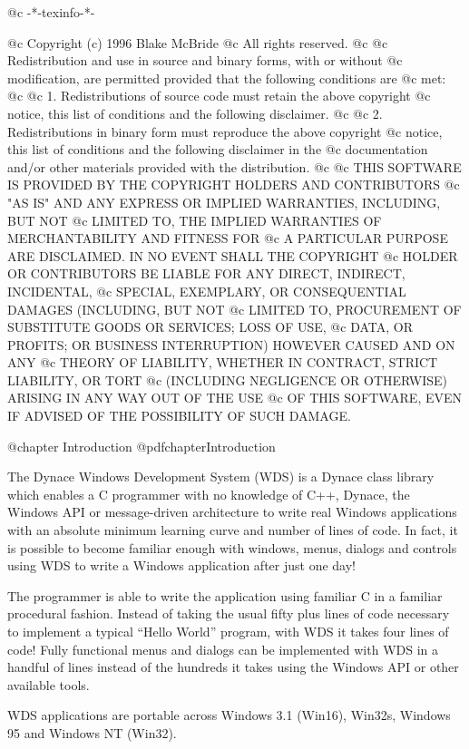 @c -*-texinfo-*-

@c  Copyright (c) 1996 Blake McBride
@c  All rights reserved.
@c
@c  Redistribution and use in source and binary forms, with or without
@c  modification, are permitted provided that the following conditions are
@c  met:
@c
@c  1. Redistributions of source code must retain the above copyright
@c  notice, this list of conditions and the following disclaimer.
@c
@c  2. Redistributions in binary form must reproduce the above copyright
@c  notice, this list of conditions and the following disclaimer in the
@c  documentation and/or other materials provided with the distribution.
@c
@c  THIS SOFTWARE IS PROVIDED BY THE COPYRIGHT HOLDERS AND CONTRIBUTORS
@c  "AS IS" AND ANY EXPRESS OR IMPLIED WARRANTIES, INCLUDING, BUT NOT
@c  LIMITED TO, THE IMPLIED WARRANTIES OF MERCHANTABILITY AND FITNESS FOR
@c  A PARTICULAR PURPOSE ARE DISCLAIMED. IN NO EVENT SHALL THE COPYRIGHT
@c  HOLDER OR CONTRIBUTORS BE LIABLE FOR ANY DIRECT, INDIRECT, INCIDENTAL,
@c  SPECIAL, EXEMPLARY, OR CONSEQUENTIAL DAMAGES (INCLUDING, BUT NOT
@c  LIMITED TO, PROCUREMENT OF SUBSTITUTE GOODS OR SERVICES; LOSS OF USE,
@c  DATA, OR PROFITS; OR BUSINESS INTERRUPTION) HOWEVER CAUSED AND ON ANY
@c  THEORY OF LIABILITY, WHETHER IN CONTRACT, STRICT LIABILITY, OR TORT
@c  (INCLUDING NEGLIGENCE OR OTHERWISE) ARISING IN ANY WAY OUT OF THE USE
@c  OF THIS SOFTWARE, EVEN IF ADVISED OF THE POSSIBILITY OF SUCH DAMAGE.

@chapter Introduction
@pdfchapter{Introduction}

The Dynace Windows Development System (WDS) is a Dynace class library
which enables a C programmer with no knowledge of C++, Dynace, the
Windows API or message-driven architecture to write real Windows
applications with an absolute minimum learning curve and number of
lines of code.  In fact, it is possible to become familiar enough with
windows, menus, dialogs and controls using WDS to write a Windows
application after just one day!

The programmer is able to write the application using familiar C in a
familiar procedural fashion.  Instead of taking the usual fifty plus
lines of code necessary to implement a typical ``Hello World'' program,
with WDS it takes four lines of code!  Fully functional menus and
dialogs can be implemented with WDS in a handful of lines instead of the
hundreds it takes using the Windows API or other available tools.

WDS applications are portable across Windows 3.1 (Win16), Win32s,
Windows 95 and Windows NT (Win32).


